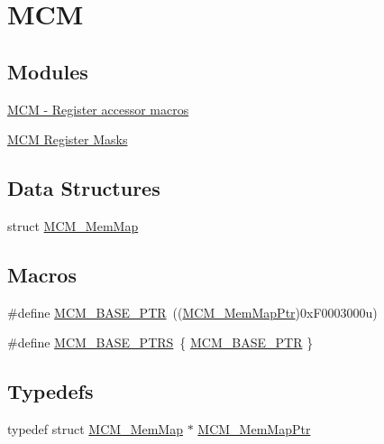 \hypertarget{group___m_c_m___peripheral}{}\section{M\+CM}
\label{group___m_c_m___peripheral}
\subsection*{Modules}
\begin{DoxyCompactItemize}
\item 
\hyperlink{group___m_c_m___register___accessor___macros}{M\+C\+M -\/ Register accessor macros}
\item 
\hyperlink{group___m_c_m___register___masks}{M\+C\+M Register Masks}
\end{DoxyCompactItemize}
\subsection*{Data Structures}
\begin{DoxyCompactItemize}
\item 
struct \hyperlink{struct_m_c_m___mem_map}{M\+C\+M\+\_\+\+Mem\+Map}
\end{DoxyCompactItemize}
\subsection*{Macros}
\begin{DoxyCompactItemize}
\item 
\#define \hyperlink{group___m_c_m___peripheral_gad41e931f176c230831e3dbad45117841}{M\+C\+M\+\_\+\+B\+A\+S\+E\+\_\+\+P\+TR}~((\hyperlink{group___m_c_m___peripheral_ga72e8bbe428d9410917903164d3a5f675}{M\+C\+M\+\_\+\+Mem\+Map\+Ptr})0x\+F0003000u)
\item 
\#define \hyperlink{group___m_c_m___peripheral_gae2d5e838ce7d2d4108738c05bf224272}{M\+C\+M\+\_\+\+B\+A\+S\+E\+\_\+\+P\+T\+RS}~\{ \hyperlink{group___m_c_m___peripheral_gad41e931f176c230831e3dbad45117841}{M\+C\+M\+\_\+\+B\+A\+S\+E\+\_\+\+P\+TR} \}
\end{DoxyCompactItemize}
\subsection*{Typedefs}
\begin{DoxyCompactItemize}
\item 
typedef struct \hyperlink{struct_m_c_m___mem_map}{M\+C\+M\+\_\+\+Mem\+Map} $\ast$ \hyperlink{group___m_c_m___peripheral_ga72e8bbe428d9410917903164d3a5f675}{M\+C\+M\+\_\+\+Mem\+Map\+Ptr}
\end{DoxyCompactItemize}


